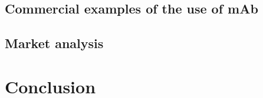 \documentclass{beamer}
\begin{document}
    \subsection{Commercial examples of the use of mAb}
    

    \subsection{Market analysis}
    

  
  
  \section*{Conclusion}
  
\end{document}
